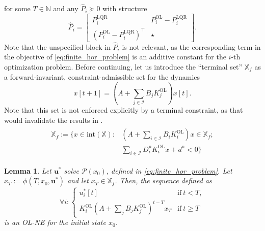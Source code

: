 \documentclass[letterpaper, 10 pt, conference]{ieeeconf}  %
\newcommand{\N}{\mathbb{N}}
\newcommand{\mc}{\mathcal}
\newcommand{\Pol}{P^{\mathrm{OL}}}
\newcommand{\Kol}{K^{\mathrm{OL}}}
\newcommand{\bu}{\boldsymbol{u}}
\newcommand{\Du}{D^{\text{u}}}
\newcommand{\du}{d^{\text{u}}}
\newcommand{\X}{\mathbb{X}}
\newcommand{\tsum}{\textstyle\sum}
\newtheorem{lemma}[theorem]{Lemma}
\begin{document}
for some $T\in\N$ and any $\hat{P}_i\succeq 0$ with structure
\begin{equation*}
    \hat{P}_i = \begin{bmatrix}
        P_i^{\text{LQR}} & \Pol_i - P_i^{\text{LQR}} \\
        (\Pol_i - P_i^{\text{LQR}})^{\top} & \star 
    \end{bmatrix}.
\end{equation*}
Note that the unspecified block in $\hat{P}_i$ is not relevant, as the corresponding term in the objective of \eqref{eq:finite_hor_problem} is an additive constant for the $i$-th optimization problem. Before continuing, let us introduce the ``terminal set'' $\X_f$ as a forward-invariant, constraint-admissible set for the dynamics 
$$x[t+1]=(A + \tsum_{j\in\mc I} B_j \Kol_j) x[t].$$
Note that this set is not enforced explicitly by a terminal constraint, as that would invalidate the results in \cite{benenati2024linear}.
\begin{align} \label{eq:term_set}
\begin{split}
    \X_f:=\{x\in\mathrm{int}(\X): & 
    (A + \tsum_{i\in\mc I} B_i \Kol_i) x\in\X_f; \\
    &\tsum_{i\in \mc I}\Du_i\Kol_i x +\du <0
    \}
\end{split}  
\end{align}
\begin{lemma}\cite[Theorem 1]{benenati2024linear}
    Let $\bu^*$ solve $\mc P(x_0)$, defined in \eqref{eq:finite_hor_problem}. Let $x_T:=\phi(T, x_0, \bu^*)$ and let $x_T\in \mathbb{X}_f$.
    Then, the sequence defined as
    \begin{equation}
        \forall i: \begin{cases}
            u_i^*[t] & \text{if} ~t < T,\\
            \Kol_i (A + \tsum_j B_j\Kol_j)^{t-T} x_T & \text{if} ~t\geq T
        \end{cases}
    \end{equation}
    is an OL-NE for the initial state $x_0$.
\end{lemma}
\end{document}
